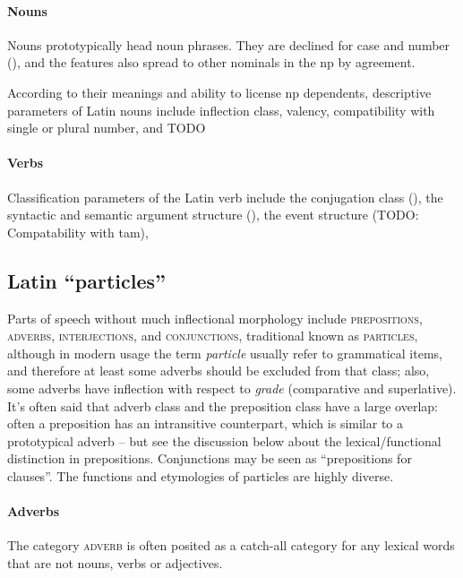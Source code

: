 \documentclass[a4paper, oneside, 12pt]{report}
\newcommand*{\term}[1]{\emph{#1}}
\newcommand*{\category}[1]{\textsc{#1}}
\begin{document}
\paragraph*{Nouns}\label{sec:grammatical.pos.lexical.noun}

Nouns prototypically head noun phrases.
They are declined for case and number (),
and the features also spread to other nominals in the \acs{np} by agreement.

According to their meanings and ability to license \acs{np} dependents, 
descriptive parameters of Latin nouns include 
inflection class, valency, compatibility with single or plural number, and TODO

\paragraph*{Verbs}

Classification parameters of the Latin verb include 
the conjugation class (),
the syntactic and semantic argument structure
(), 
the event structure (TODO: Compatability with \acs{tam}),

\subsection{Latin ``particles''}

Parts of speech without much inflectional morphology include \category{prepositions}, \category{adverbs},
\category{interjections}, and \category{conjunctions},
traditional known as \category{particles}, 
although in modern usage the term \term{particle}
usually refer to grammatical items, 
and therefore at least some adverbs should be excluded from that class;  
also, some adverbs have inflection with respect to \emph{grade} 
(comparative and superlative).
It's often said that adverb class and the preposition class have a large overlap:
often a preposition has an intransitive counterpart,
which is similar to a prototypical adverb -- 
but see the discussion below about the lexical/functional distinction in prepositions.
Conjunctions may be seen as ``prepositions for clauses''.
The functions and etymologies of particles are highly diverse.

\paragraph*{Adverbs}
The category \category{adverb} is often posited as a catch-all category
for any lexical words that are not nouns, verbs or adjectives.
\end{document}
